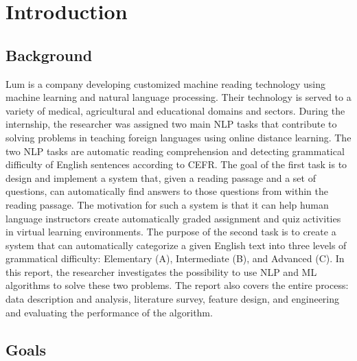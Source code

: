 
\chapter{Introduction} %

\label{Chapter1} %


\section{Background}

Lum is a company developing customized machine reading technology using machine learning and natural language processing. Their technology is served to a variety of medical, agricultural and educational domains and sectors. During the internship, the researcher was assigned two main NLP tasks that contribute to solving problems in teaching foreign languages using online distance learning. The two NLP tasks are automatic reading comprehension and detecting grammatical difficulty of English sentences according to CEFR. The goal of the first task is to design and implement a system that, given a reading passage and a set of questions, can automatically find answers to those questions from within the reading passage. The motivation for such a system is that it can help human
language instructors create automatically graded assignment and quiz activities
in virtual learning environments. The purpose of the second task is to create a system that can automatically categorize a given English text into three
levels of grammatical difficulty: Elementary (A), Intermediate (B), and Advanced (C). In this report, the researcher investigates the possibility to use NLP and ML algorithms to solve these two problems. The report also covers the entire process: data description and analysis, literature survey, feature design, and engineering and evaluating the performance of the algorithm. 

\section{Goals}

